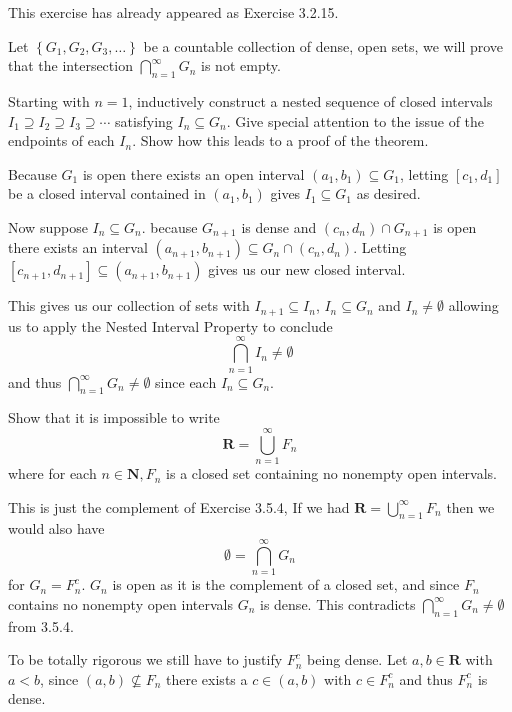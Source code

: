 \begin{solution}
  This exercise has already appeared as Exercise 3.2.15.
\end{solution}

\begin{exercise}
  Let $\left\{G_{1}, G_{2}, G_{3}, \ldots\right\}$ be a countable collection of dense, open sets, we will prove that the intersection $\bigcap_{n=1}^{\infty} G_{n}$ is not empty.

  Starting with $n=1$, inductively construct a nested sequence of closed intervals $I_{1} \supseteq I_{2} \supseteq I_{3} \supseteq \cdots$ satisfying $I_{n} \subseteq G_{n}$. Give special attention to the issue of the endpoints of each $I_{n}$. Show how this leads to a proof of the theorem.
\end{exercise}

\begin{solution}
  Because $G_1$ is open there exists an open interval $(a_1,b_1) \subseteq G_1$, letting $[c_1, d_1]$ be a closed interval contained in $(a_1, b_1)$ gives $I_1 \subseteq G_1$ as desired.

  Now suppose $I_{n} \subseteq G_{n}$. because $G_{n+1}$ is dense and $(c_{n}, d_{n}) \cap G_{n+1}$ is open there exists an interval $(a_{n+1}, b_{n+1}) \subseteq G_n \cap (c_{n}, d_{n})$. Letting $[c_{n+1}, d_{n+1}] \subseteq (a_{n+1}, b_{n+1})$ gives us our new closed interval.

  This gives us our collection of sets with $I_{n+1} \subseteq I_n$, $I_n \subseteq G_n$ and $I_n \ne \emptyset$ allowing us to apply the Nested Interval Property to conclude
  $$
  \bigcap_{n=1}^\infty I_n \ne \emptyset
  $$
  and thus $\bigcap_{n=1}^\infty G_n \ne \emptyset$ since each $I_n \subseteq G_n$.
\end{solution}

\begin{exercise}
  Show that it is impossible to write
  $$
  \mathbf{R}=\bigcup_{n=1}^{\infty} F_{n}
  $$
  where for each $n \in \mathbf{N}, F_{n}$ is a closed set containing no nonempty open intervals.
\end{exercise}

\begin{solution}
  This is just the complement of Exercise 3.5.4, If we had $\mathbf R = \bigcup_{n=1}^\infty F_n$ then we would also have
  $$\emptyset = \bigcap_{n=1}^\infty G_n$$
  for $G_n = F_n^c$. $G_n$ is open as it is the complement of a closed set, and since $F_n$ contains no nonempty open intervals $G_n$ is dense. This contradicts $\bigcap_{n=1}^\infty G_n \ne \emptyset$  from 3.5.4.

  To be totally rigorous we still have to justify $F_n^c$ being dense. Let $a,b \in \mathbf{R}$ with $a < b$, since $(a,b) \not \subseteq F_n$ there exists a $c \in (a,b)$ with $c \in F_n^c$ and thus $F_n^c$ is dense.
\end{solution}

